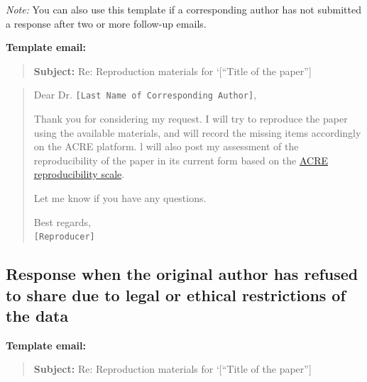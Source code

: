 \documentclass[]{book}
\begin{document}
\emph{Note:} You can also use this template if a corresponding author has not submitted a response after two or more follow-up emails.

\textbf{Template email:}

\begin{quote}
\textbf{Subject:} Re: Reproduction materials for `{[}``Title of the paper''{]}
\end{quote}

\begin{quote}
Dear Dr. \texttt{{[}Last\ Name\ of\ Corresponding\ Author{]}},

Thank you for considering my request. I will try to reproduce the paper using the available materials, and will record the missing items accordingly on the ACRE platform. l will also post my assessment of the reproducibility of the paper in its current form based on the \href{https://bitss.github.io/ACRE/assessment.html\#levels-of-computational-reproducibility-for-a-specific-output}{ACRE reproducibility scale}.

Let me know if you have any questions.

Best regards,\\
\texttt{{[}Reproducer{]}}
\end{quote}

\hypertarget{response-when-the-original-author-has-refused-to-share-due-to-legal-or-ethical-restrictions-of-the-data}{%
\subsection{Response when the original author has refused to share due to legal or ethical restrictions of the data}\label{response-when-the-original-author-has-refused-to-share-due-to-legal-or-ethical-restrictions-of-the-data}}

\textbf{Template email:}

\begin{quote}
\textbf{Subject:} Re: Reproduction materials for `{[}``Title of the paper''{]}
\end{quote}
\end{document}

